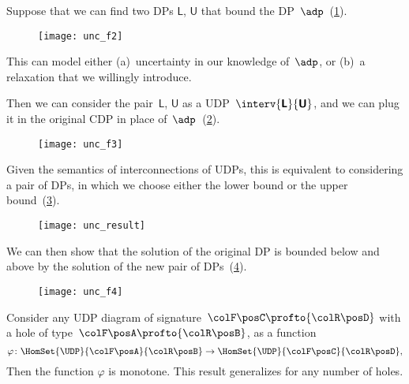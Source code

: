 Suppose that we can find two DPs $\boldsymbol{\mathsf{L}}$, $\boldsymbol{\mathsf{U}}$ that bound the DP~$\adp$~(\cref{fig:consider2}).

\begin{figure}[h!]
    \texttt{[image: unc\_f2]}
    \caption{}
    \label{fig:consider2}
\end{figure}

This can model either (a)~uncertainty in our knowledge of~$\adp$, or (b)~a relaxation that we willingly introduce.

Then we can consider the pair~$\boldsymbol{\mathsf{L}}$,
$\boldsymbol{\mathsf{U}}$ as a UDP~$\interv {\boldsymbol{\mathsf{L}}} {\boldsymbol{\mathsf{U}}}$,
and we can plug it in the original CDP in place of~$\adp$~(\cref{fig:luinside}).

\begin{figure}[h!]
    \texttt{[image: unc\_f3]}
    \caption{}
    \label{fig:luinside}
\end{figure}

Given the semantics of interconnections of UDPs, this is equivalent to considering a pair of DPs, in which we choose either the lower bound or the upper bound~(\cref{fig:pair}).

\begin{figure}[h!]
    \texttt{[image: unc\_result]}
    \caption{}
    \label{fig:pair}
\end{figure}

We can then show that the solution of the original DP is bounded below and above by the solution of the new pair of DPs~(\cref{fig:domin}).

\begin{figure}[h!]
    \texttt{[image: unc\_f4]}
    \caption{}
    \label{fig:domin}
\end{figure}

\begin{proposition}
    Consider any UDP diagram of signature~${\colF\posC }\profto {\colR\posD}$ with a hole
    of type~${\colF\posA} \profto {\colR\posB}$, as a function
    \begin{equation}
        \varphi\colon \HomSet{\UDP}{\colF\posA}{\colR\posB} \to  \HomSet{\UDP}{\colF\posC}{\colR\posD},
    \end{equation}
    Then the function $\varphi$ is monotone.
    This result generalizes for any number of holes.
\end{proposition}

